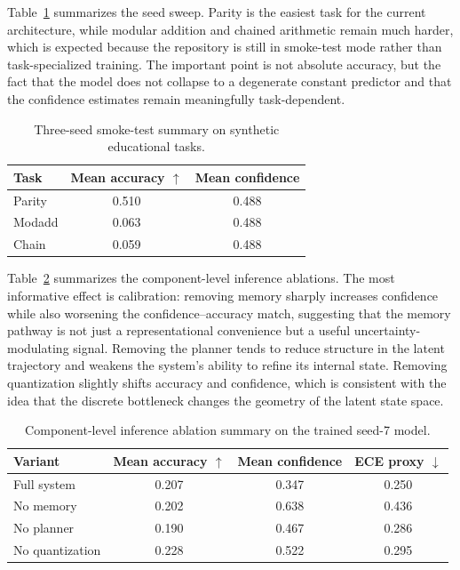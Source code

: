 \documentclass[11pt]{article}
\newcommand{\1}{\mathbbm{1}}
\begin{document}
Table~\ref{tab:seed_sweep} summarizes the seed sweep. Parity is the easiest task for the current architecture, while modular addition and chained arithmetic remain much harder, which is expected because the repository is still in smoke-test mode rather than task-specialized training. The important point is not absolute accuracy, but the fact that the model does not collapse to a degenerate constant predictor and that the confidence estimates remain meaningfully task-dependent.

\begin{table}[h]
\centering
\caption{Three-seed smoke-test summary on synthetic educational tasks.}
\label{tab:seed_sweep}
\begin{tabular}{lcc}
\toprule
Task & Mean accuracy $\uparrow$ & Mean confidence \\
\midrule
Parity & 0.510 & 0.488 \\
Modadd & 0.063 & 0.488 \\
Chain & 0.059 & 0.488 \\
\bottomrule
\end{tabular}
\end{table}

Table~\ref{tab:variant_summary} summarizes the component-level inference ablations. The most informative effect is calibration: removing memory sharply increases confidence while also worsening the confidence--accuracy match, suggesting that the memory pathway is not just a representational convenience but a useful uncertainty-modulating signal. Removing the planner tends to reduce structure in the latent trajectory and weakens the system's ability to refine its internal state. Removing quantization slightly shifts accuracy and confidence, which is consistent with the idea that the discrete bottleneck changes the geometry of the latent state space.

\begin{table}[h]
\centering
\caption{Component-level inference ablation summary on the trained seed-7 model.}
\label{tab:variant_summary}
\begin{tabular}{lccc}
\toprule
Variant & Mean accuracy $\uparrow$ & Mean confidence & ECE proxy $\downarrow$ \\
\midrule
Full system & 0.207 & 0.347 & 0.250 \\
No memory & 0.202 & 0.638 & 0.436 \\
No planner & 0.190 & 0.467 & 0.286 \\
No quantization & 0.228 & 0.522 & 0.295 \\
\bottomrule
\end{tabular}
\end{table}
\end{document}
